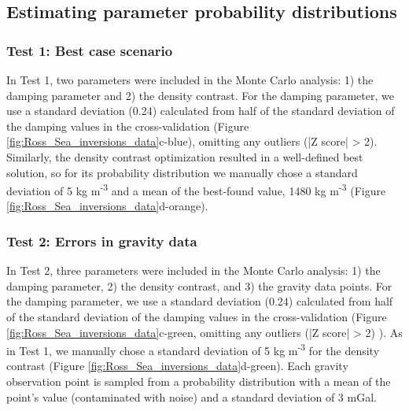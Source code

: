 \documentclass[tc, manuscript]{copernicus}
\begin{document}
\subsection{Estimating parameter probability distributions}\label{app:uncertainty_distributions}
\subsubsection{Test 1: Best case scenario}
In Test 1, two parameters were included in the Monte Carlo analysis: 1) the damping parameter and 2) the density contrast. For the damping parameter, we use a standard deviation (0.24) calculated from half of the standard deviation of the damping values in the cross-validation (Figure \ref{fig:Ross_Sea_inversions_data}c-blue), omitting any outliers (|Z score| > 2). Similarly, the density contrast optimization resulted in a well-defined best solution, so for its probability distribution we manually chose a standard deviation of 5 kg m\textsuperscript{-3} and a mean of the best-found value, 1480 kg m\textsuperscript{-3} (Figure \ref{fig:Ross_Sea_inversions_data}d-orange).


\subsubsection{Test 2: Errors in gravity data}
In Test 2, three parameters were included in the Monte Carlo analysis: 1) the damping parameter, 2) the density contrast, and 3) the gravity data points. For the damping parameter, we use a standard deviation (0.24) calculated from half of the standard deviation of the damping values in the cross-validation (Figure \ref{fig:Ross_Sea_inversions_data}c-green, omitting any outliers (|Z score| > 2) ). As in Test 1, we manually chose a standard deviation of 5 kg m\textsuperscript{-3} for the density contrast (Figure \ref{fig:Ross_Sea_inversions_data}d-green). Each gravity observation point is sampled from a probability distribution with a mean of the point's value (contaminated with noise) and a standard deviation of 3 mGal.
\end{document}
